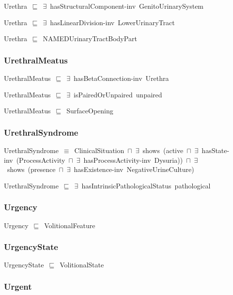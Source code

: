 \documentclass{article}
\begin{document}
Urethra~\ensuremath{\sqsubseteq}~\ensuremath{\exists}~hasStructuralComponent-inv~GenitoUrinarySystem~

Urethra~\ensuremath{\sqsubseteq}~\ensuremath{\exists}~hasLinearDivision-inv~LowerUrinaryTract~

Urethra~\ensuremath{\sqsubseteq}~NAMEDUrinaryTractBodyPart~

\subsubsection*{UrethralMeatus}

UrethralMeatus~\ensuremath{\sqsubseteq}~\ensuremath{\exists}~hasBetaConnection-inv~Urethra~

UrethralMeatus~\ensuremath{\sqsubseteq}~\ensuremath{\exists}~isPairedOrUnpaired~unpaired~

UrethralMeatus~\ensuremath{\sqsubseteq}~SurfaceOpening~

\subsubsection*{UrethralSyndrome}

UrethralSyndrome~\ensuremath{\equiv}~ClinicalSituation~\ensuremath{\sqcap}~\ensuremath{\exists}~shows~(active~\ensuremath{\sqcap}~\ensuremath{\exists}~hasState-inv~(ProcessActivity~\ensuremath{\sqcap}~\ensuremath{\exists}~hasProcessActivity-inv~Dysuria))~\ensuremath{\sqcap}~\ensuremath{\exists}~shows~(presence~\ensuremath{\sqcap}~\ensuremath{\exists}~hasExistence-inv~NegativeUrineCulture)

UrethralSyndrome~\ensuremath{\sqsubseteq}~\ensuremath{\exists}~hasIntrinsicPathologicalStatus~pathological~

\subsubsection*{Urgency}

Urgency~\ensuremath{\sqsubseteq}~VolitionalFeature~

\subsubsection*{UrgencyState}

UrgencyState~\ensuremath{\sqsubseteq}~VolitionalState~

\subsubsection*{Urgent}
\end{document}
